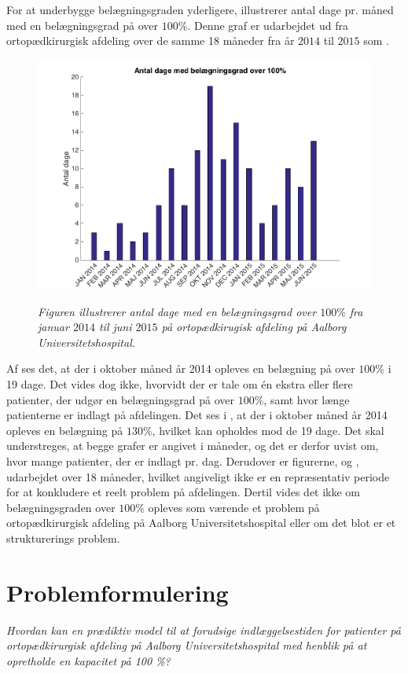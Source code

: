 For at underbygge belægningsgraden yderligere, illustrerer  antal dage pr. måned med en belægningsgrad på over $100 \%$. Denne graf er udarbejdet ud fra ortopædkirurgisk afdeling over de samme 18 måneder fra år $2014$ til $2015$ som . \cite{SDS2015} 

\begin{figure}[H]
	\flushleft 
	\centering
	\includegraphics[scale=.4]{figures/antaldage.png}
	\label{antaldage}
	\flushleft
	\caption{\textit{Figuren illustrerer antal dage med en belægningsgrad over $100 \%$ fra januar 			$2014$ til juni $2015$ på ortopædkirugisk afdeling på Aalborg Universitetshospital.\cite{SDS2015}}}
\end{figure}

\noindent
Af  ses det, at der i oktober måned år 2014 opleves en belægning på over $100 \%$ i 19 dage. Det vides dog ikke, hvorvidt der er tale om én ekstra eller flere patienter, der udgør en belægningsgrad på over $100 \%$, samt hvor længe patienterne er indlagt på afdelingen. Det ses i , at der i oktober måned år 2014 opleves en belægning på $130 \%$, hvilket kan opholdes mod de 19 dage. Det skal understreges, at begge grafer er angivet i måneder, og det er derfor uvist om, hvor mange patienter, der er indlagt pr. dag. Derudover er figurerne,  og , udarbejdet over 18 måneder, hvilket angiveligt ikke er en repræsentativ periode for at konkludere et reelt problem på afdelingen. Dertil vides det ikke om belægningsgraden over $100 \%$ opleves som værende et problem på ortopædkirurgisk afdeling på Aalborg Universitetshospital eller om det blot er et strukturerings problem. 

\section{Problemformulering}
\textit{Hvordan kan en prædiktiv model til at forudsige indlæggelsestiden for patienter på ortopædkirurgisk afdeling på Aalborg Universitetshospital med henblik på at opretholde en kapacitet på 100 \%?}
